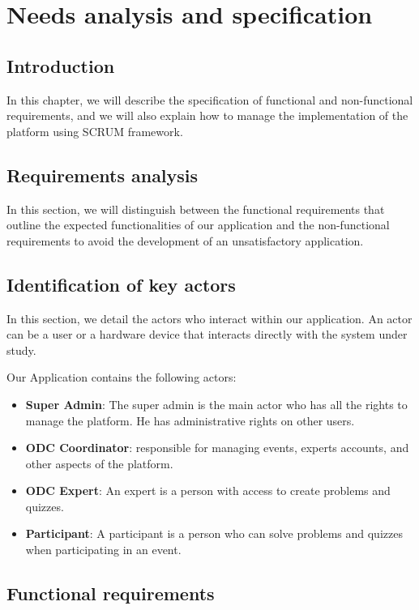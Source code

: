 \chapter{Needs analysis and specification}
\section{Introduction}
In this chapter, we will describe the specification of functional and
non-functional requirements, and we will also explain how to manage the
implementation of the platform using SCRUM framework.

\section{Requirements analysis}
In this section, we will distinguish between the functional requirements that
outline the expected functionalities of our application and the non-functional
requirements to avoid the development of an unsatisfactory application.

\section{Identification of key actors}
In this section, we detail the actors who interact within our application. An
actor can be a user or a hardware device that interacts directly with the
system under study.

Our Application contains the following actors:
\begin{itemize}
      \item \textbf{Super Admin}: The super admin is the main actor who has all
            the rights to manage the platform. He has administrative rights on
            other users.
      \item \textbf{ODC Coordinator}: responsible for managing events, experts
            accounts, and other aspects of the platform.
      \item \textbf{ODC Expert}: An expert is a person with access to create
            problems and quizzes.
      \item \textbf{Participant}: A participant is a person who can solve problems
            and quizzes when participating in an event.
\end{itemize}

\section{Functional requirements}

